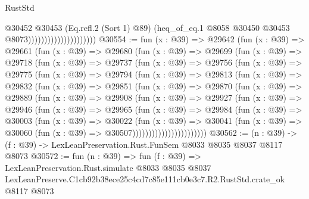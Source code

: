 \begin{lexlean}{RustStd}
\begin{coremodule}
                                          @30452
                                            @30453
                                            (Eq.refl.{2} (Sort 1) @89)
                                            (heq_of_eq.{1}
                                              @8058
                                              @30450
                                              @30453
                                              @8073)))))))))))))))))))))
@30554 := fun (x : @39) =>
  @29642
    (fun (x : @39) =>
    @29661
      (fun (x : @39) =>
      @29680
        (fun (x : @39) =>
        @29699
          (fun (x : @39) =>
          @29718
            (fun (x : @39) =>
            @29737
              (fun (x : @39) =>
              @29756
                (fun (x : @39) =>
                @29775
                  (fun (x : @39) =>
                  @29794
                    (fun (x : @39) =>
                    @29813
                      (fun (x : @39) =>
                      @29832
                        (fun (x : @39) =>
                        @29851
                          (fun (x : @39) =>
                          @29870
                            (fun (x : @39) =>
                            @29889
                              (fun (x : @39) =>
                              @29908
                                (fun (x : @39) =>
                                @29927
                                  (fun (x : @39) =>
                                  @29946
                                    (fun (x : @39) =>
                                    @29965
                                      (fun (x : @39) =>
                                      @29984
                                        (fun (x : @39) =>
                                        @30003
                                          (fun (x : @39) =>
                                          @30022
                                            (fun (x : @39) =>
                                            @30041
                                              (fun (x : @39) =>
                                              @30060 (fun (x : @39) => @30507)))))))))))))))))))))))
@30562 := (n : @39) -> (f : @39) -> LexLeanPreservation.Rust.FunSem @8033 @8035 @8037 @8117 @8073
@30572 := fun (n : @39) =>
  fun (f : @39) =>
  LexLeanPreservation.Rust.simulate
    @8033
    @8035
    @8037
    LexLeanPreserve.C1cb92b38ece25c4cd7c85e111cb0e3c7.R2.RustStd.crate_ok
    @8117
    @8073
\end{coremodule}
\end{lexlean}
